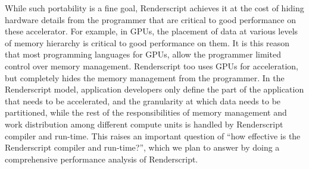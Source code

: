While such portability is a fine goal, Renderscript achieves it at the cost of
hiding hardware details from the programmer that are critical to good
performance on these accelerator. For example, in GPUs, the placement of data at
various levels of memory hierarchy is critical to good performance on them.
It is this reason that most programming languages for GPUs, allow the programmer
limited control over memory management. Renderscript too uses GPUs for acceleration, but
completely hides the memory management from the programmer. In the Renderscript
model, application developers only define the part of the application that needs
to be accelerated, and the granularity at which data needs to be partitioned,
while the rest of the responsibilities of memory management and work distribution
among different compute units is handled by Renderscript compiler and run-time.
This raises an important
question of ``how effective is the Renderscript compiler and run-time?'', which
we plan to answer by doing a comprehensive performance analysis of Renderscript.
